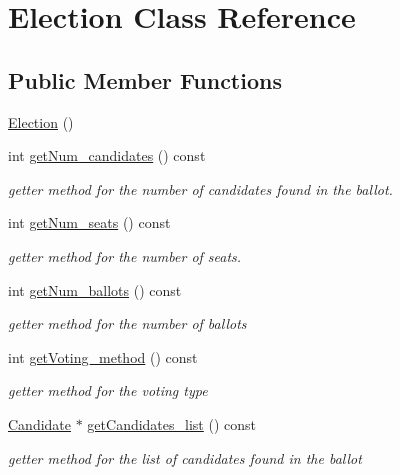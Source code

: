 \hypertarget{classElection}{}\section{Election Class Reference}
\label{classElection}
\subsection*{Public Member Functions}
\begin{DoxyCompactItemize}
\item 
\hyperlink{classElection_a384f3cbb012bb7c7e5344a6f9226f99f}{Election} ()
\item 
int \hyperlink{classElection_ad61b43a7ccdc9a1411b1536befd7cb09}{get\+Num\+\_\+candidates} () const 
\begin{DoxyCompactList}\small\item\em getter method for the number of candidates found in the ballot. \end{DoxyCompactList}\item 
int \hyperlink{classElection_a494b04f3b0b33cc9d4f384e99d834131}{get\+Num\+\_\+seats} () const 
\begin{DoxyCompactList}\small\item\em getter method for the number of seats. \end{DoxyCompactList}\item 
int \hyperlink{classElection_a8e4005023f409d4e61a926e73a45bd53}{get\+Num\+\_\+ballots} () const 
\begin{DoxyCompactList}\small\item\em getter method for the number of ballots \end{DoxyCompactList}\item 
int \hyperlink{classElection_a1129f07c2c5b5257434667b3eb9d75e1}{get\+Voting\+\_\+method} () const 
\begin{DoxyCompactList}\small\item\em getter method for the voting type \end{DoxyCompactList}\item 
\hyperlink{classCandidate}{Candidate} $\ast$ \hyperlink{classElection_abf93cdb5de1615ab8326793591325ecc}{get\+Candidates\+\_\+list} () const 
\begin{DoxyCompactList}\small\item\em getter method for the list of candidates found in the ballot \end{DoxyCompactList}\item 

\end{DoxyCompactItemize}
